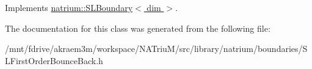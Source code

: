 Implements \hyperlink{classnatrium_1_1SLBoundary_a7c166745b087afdd137013f994733b89}{natrium::SLBoundary$<$ dim $>$}.

The documentation for this class was generated from the following file:\begin{DoxyCompactItemize}
\item 
/mnt/fdrive/akraem3m/workspace/NATriuM/src/library/natrium/boundaries/SLFirstOrderBounceBack.h\end{DoxyCompactItemize}
